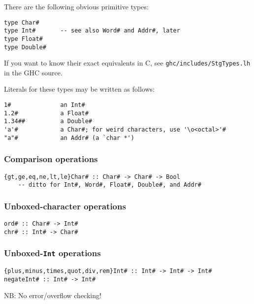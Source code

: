 There are the following obvious primitive types:
\begin{verbatim}
type Char#
type Int#       -- see also Word# and Addr#, later
type Float#
type Double#
\end{verbatim}
If you want to know their exact equivalents in C, see
\mbox{\tt ghc/includes/StgTypes.lh} in the GHC source.

Literals for these types may be written as follows:
\begin{verbatim}
1#              an Int#
1.2#            a Float#
1.34##          a Double#
'a'#            a Char#; for weird characters, use '\o<octal>'#
"a"#            an Addr# (a `char *')
\end{verbatim}

\subsubsection{Comparison operations}
\begin{verbatim}
{gt,ge,eq,ne,lt,le}Char# :: Char# -> Char# -> Bool
    -- ditto for Int#, Word#, Float#, Double#, and Addr#
\end{verbatim}

\subsubsection{Unboxed-character operations}
\begin{verbatim}
ord# :: Char# -> Int#
chr# :: Int# -> Char#
\end{verbatim}

\subsubsection{Unboxed-\mbox{\tt Int} operations}
\begin{verbatim}
{plus,minus,times,quot,div,rem}Int# :: Int# -> Int# -> Int#
negateInt# :: Int# -> Int#
\end{verbatim}
NB: No error/overflow checking!

